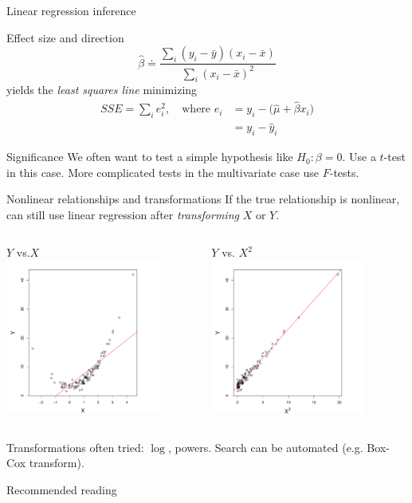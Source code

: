 \documentclass[serif,mathserif,professionalfonts]{beamer}
\begin{document}
\begin{frame}{Linear regression inference}
  \begin{block}{Effect size and direction}
    $$\hat{\beta} \doteq \frac
    {\sum_i (y_i-\bar{y})(x_i-\bar{x})}
    {\sum_i (x_i-\bar{x})^2}$$
   yields the \emph{least squares line} minimizing 
   \begin{align*}   
     SSE=\sum_i e_i^2, \quad \text{where }
     e_i & = y_i-\big(\hat{\mu}+\hat{\beta}x_i\big) \\[-0.3cm]
         & = y_i-\hat{y}_i
  \end{align*}
  \end{block}
  \vspace{-1cm}
  \begin{block}{Significance}
    We often want to test a simple hypothesis like $H_0: \beta=0$.
    Use a $t$-test in this case.  More complicated tests in the
    multivariate case use $F$-tests.
  \end{block}

\end{frame}


\begin{frame}{Nonlinear relationships and transformations}
  If the true relationship is nonlinear, can still use
  linear regression after \emph{transforming} $X$ or $Y$.

  \begin{columns}[c]
    \column{2in}
    \begin{center}
      $Y$ vs.$ X$
      \includegraphics[width=2in]{before.pdf}
    \end{center}
   
    \column{2in}
    \begin{center}
      $Y$ vs. $X^2$
    \includegraphics[width=2in]{after.pdf}    
    \end{center}

  \end{columns}

  Transformations often tried: $\log$, powers.  Search can be
  automated (e.g. Box-Cox transform).

\end{frame}



\begin{frame}{Recommended reading}
  \nocite{*}
  {}
  
\end{frame}
\end{document}
